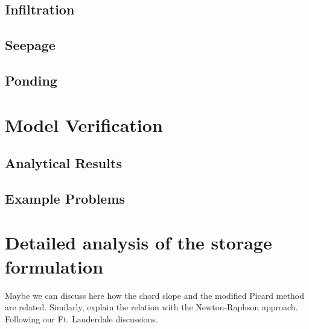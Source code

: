 \documentclass[fleqn]{article}
\begin{document}
\subsection{Infiltration}
\subsection{Seepage}
\subsection{Ponding}

\section{Model Verification}
\subsection{Analytical Results}
\subsection{Example Problems}

\appendix
\section{Detailed analysis of the storage formulation}
Maybe we can discuss here how the chord slope and the modified
Picard method are related. Similarly, explain the relation
with the Newton-Raphson approach. Following our Ft. Lauderdale
discussions.


 
\end{document}
